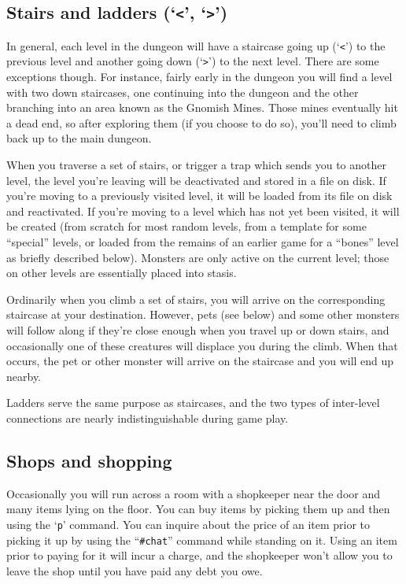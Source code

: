 \subsection*{Stairs and ladders (`{\tt <}', `{\tt >}')}

In general, each level in the dungeon will have a staircase going up
(`{\tt <}') to the previous level and another going down (`{\tt >}')
to the next
level.  There are some exceptions though.  For instance, fairly early
in the dungeon you will find a level with two down staircases, one
continuing into the dungeon and the other branching into an area
known as the Gnomish Mines.  Those mines eventually hit a dead end,
so after exploring them (if you choose to do so), you'll need to
climb back up to the main dungeon.

When you traverse a set of stairs, or trigger a trap which sends you
to another level, the level you're leaving will be deactivated and
stored in a file on disk.  If you're moving to a previously visited
level, it will be loaded from its file on disk and reactivated.  If
you're moving to a level which has not yet been visited, it will be
created (from scratch for most random levels, from a template for
some ``special'' levels, or loaded from the remains of an earlier game
for a ``bones'' level as briefly described below).  Monsters are only
active on the current level; those on other levels are essentially
placed into stasis.

Ordinarily when you climb a set of stairs, you will arrive on the
corresponding staircase at your destination.  However, pets (see below)
and some other monsters will follow along if they're close enough when
you travel up or down stairs, and occasionally one of these creatures
will displace you during the climb.  When that occurs, the pet or other
monster will arrive on the staircase and you will end up nearby.

Ladders serve the same purpose as staircases, and the two types of
inter-level connections are nearly indistinguishable during game play.

\subsection*{Shops and shopping}

Occasionally you will run across a room with a shopkeeper near the door
and many items lying on the floor.  You can buy items by picking them
up and then using the `{\tt p}' command.  You can inquire about the price
of an item prior to picking it up by using the ``{\tt \#chat}'' command
while standing on it.  Using an item prior to paying for it will incur a
charge, and the shopkeeper won't allow you to leave the shop until you
have paid any debt you owe.

